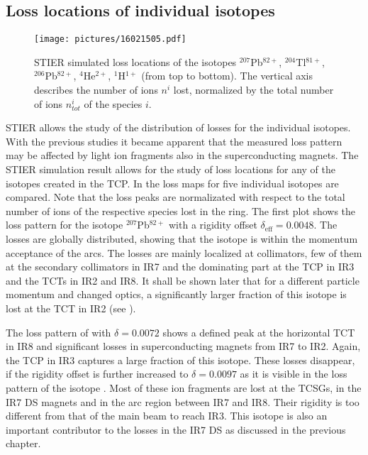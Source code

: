 \subsection{Loss locations of individual isotopes}

\begin{figure}[htbp]  
    \centering
    \texttt{[image: pictures/16021505.pdf]}
    \caption{STIER simulated loss locations of the isotopes $^{207}$Pb$^{82+}$, $^{204}$Tl$^{81+}$, $^{206}$Pb$^{82+}$, $^{4}$He$^{2+}$, $^{1}$H$^{1+}$ (from top to bottom). The vertical axis describes the number of ions $n^i$ lost, normalized by the total number of ions $n^i_{tot}$ of the species $i$. }  
    \label{pic:16021501}
\end{figure}

STIER allows the study of the distribution of losses for the individual isotopes. With the previous studies it became apparent that the measured loss pattern may be affected by light ion fragments also in the superconducting magnets. The STIER simulation result allows for the study of loss locations for any of the isotopes created in the TCP. In  the loss maps for five individual isotopes are compared. Note that the loss peaks are normalizated with respect to the total number of ions of the respective species lost in the ring. The first plot shows the loss pattern for the isotope $^{207}$Pb$^{82+}$ with a rigidity offset $\delta_\text{eff} = 0.0048$. The losses are globally distributed, showing that the isotope is within the momentum acceptance of the arcs. The losses are mainly localized at collimators, few of them at the secondary collimators in IR7 and the dominating part at the TCP in IR3 and the TCTs in IR2 and IR8. It shall be shown later that for a different particle momentum and changed optics, a significantly larger fraction of this isotope is lost at the TCT in IR2 (see ). 

The loss pattern of  with $\delta = 0.0072$ shows a defined peak at the horizontal TCT in IR8 and significant losses in superconducting magnets from IR7 to IR2. Again, the TCP in IR3 captures a large fraction of this isotope. These losses disappear, if the rigidity offset is further increased to $\delta=0.0097$ as it is visible in the loss pattern of the isotope . Most of these ion fragments are lost at the TCSGs, in the IR7 DS magnets and in the arc region between IR7 and IR8. Their rigidity is too different from that of the main beam to reach IR3. This isotope is also an important contributor to the losses in the IR7 DS as discussed in the previous chapter. 

